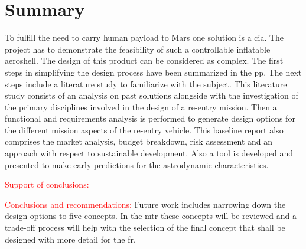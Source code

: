 \section*{Summary}\label{cha:summary}

To fulfill the need to carry human payload to Mars one solution is a \acrfull{cia}. The project has to demonstrate the feasibility of such a controllable inflatable aeroshell. The design of this product can be considered as complex. The first steps in simplifying the design process have been summarized in the \acrfull{pp}. The next steps include a literature study to familiarize with the subject. This literature study consists of an analysis on past solutions alongside with the investigation of the primary disciplines involved in the design of a re-entry mission. Then a functional and requirements analysis is performed to generate design options for the different mission aspects of the re-entry vehicle. This baseline report also comprises the market analysis, budget breakdown, risk assessment and an approach with respect to sustainable development. Also a tool is developed and presented to make early predictions for the astrodynamic characteristics. 

\textcolor{red}{Support of conclusions:}

\textcolor{red}{Conclusions and recommendations:}
Future work includes narrowing down the design options to five concepts. In the \acrfull{mtr} these concepts will be reviewed and a trade-off process will help with the selection of the final concept that shall be designed with more detail for the \acrfull{fr}.
